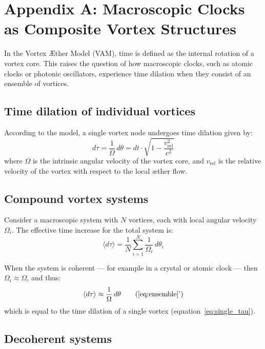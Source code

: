 \section*{Appendix A: Macroscopic Clocks as Composite Vortex Structures}
\label{appendix:ClocksInVortexStructures}

In the Vortex Æther Model (VAM), time is defined as the internal rotation of a vortex core. This raises the question of how macroscopic clocks, such as atomic clocks or photonic oscillators, experience time dilation when they consist of an ensemble of vortices.

\subsection*{Time dilation of individual vortices}

According to the model, a single vortex node undergoes time dilation given by:
\begin{equation}
d\tau = \frac{1}{\Omega} \, d\theta = dt \cdot \sqrt{1 - \frac{v_\text{rel}^2}{c^2}} \label{eq:single_tau}
\end{equation}
where \( \Omega \) is the intrinsic angular velocity of the vortex core, and \( v_\text{rel} \) is the relative velocity of the vortex with respect to the local æther flow.

\subsection*{Compound vortex systems}

Consider a macroscopic system with \( N \) vortices, each with local angular velocity \( \Omega_i \). The effective time increase for the total system is:
\begin{equation}
\langle d\tau \rangle = \frac{1}{N} \sum_{i=1}^{N} \frac{1}{\Omega_i} \, d\theta_i \label{eq:ensemble}
\end{equation}

When the system is coherent — for example in a crystal or atomic clock — then \( \Omega_i \approx \Omega \), and thus:
\begin{equation}
\langle d\tau \rangle \approx \frac{1}{\Omega} \, d\theta \tag{\ref{eq:ensemble}'}
\end{equation}
which is equal to the time dilation of a single vortex (equation~\ref{eq:single_tau}).

\subsection*{Decoherent systems}

